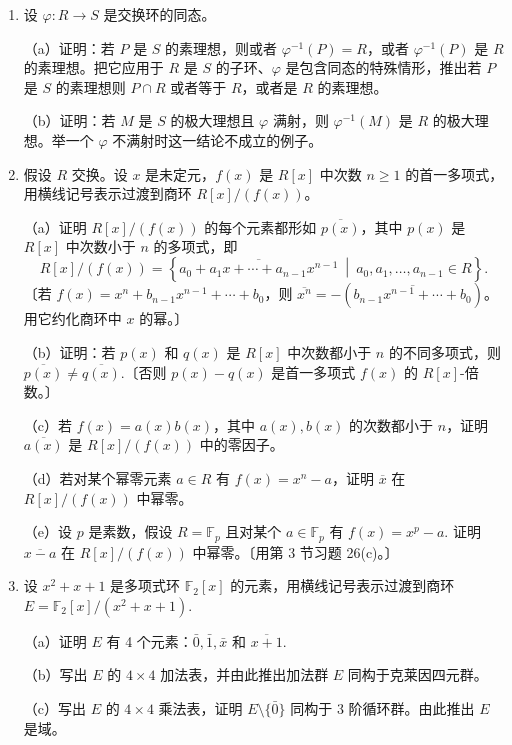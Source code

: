 \begin{enumerate}
\item 设 \(\varphi : R \to S\) 是交换环的同态。

（a）证明：若 \(P\) 是 \(S\) 的素理想，则或者 \(\varphi^{-1}(P) = R\)，或者 \(\varphi^{-1}(P)\) 是 \(R\) 的素理想。把它应用于 \(R\) 是 \(S\) 的子环、\(\varphi\) 是包含同态的特殊情形，推出若 \(P\) 是 \(S\) 的素理想则 \(P \cap R\) 或者等于 \(R\)，或者是 \(R\) 的素理想。

（b）证明：若 \(M\) 是 \(S\) 的极大理想且 \(\varphi\) 满射，则 \(\varphi^{-1}(M)\) 是 \(R\) 的极大理想。举一个 \(\varphi\) 不满射时这一结论不成立的例子。

\item 假设 \(R\) 交换。设 \(x\) 是未定元，\(f(x)\) 是 \(R[x]\) 中次数 \(n \geq 1\) 的首一多项式，用横线记号表示过渡到商环 \(R[x]/(f(x))\)。

（a）证明 \(R[x]/(f(x))\) 的每个元素都形如 \(\overline{p(x)}\)，其中 \(p(x)\) 是 \(R[x]\) 中次数小于 \(n\) 的多项式，即
\[
R[x]/(f(x)) = \left\{\overline{a_0 + a_1x + \cdots + a_{n-1}x^{n-1}} \ \middle|\ a_0, a_1, \ldots, a_{n-1} \in R\right\}.
\]
〔若 \(f(x) = x^n + b_{n-1}x^{n-1} + \cdots + b_0\)，则 \(\overline{x^n} = -(\overline{b_{n-1}x^{n-1} + \cdots + b_0})\)。用它约化商环中 \(x\) 的幂。〕

（b）证明：若 \(p(x)\) 和 \(q(x)\) 是 \(R[x]\) 中次数都小于 \(n\) 的不同多项式，则 \(\overline{p(x)} \neq \overline{q(x)}\).〔否则 \(p(x) - q(x)\) 是首一多项式 \(f(x)\) 的 \(R[x]\)-倍数。〕

（c）若 \(f(x) = a(x)b(x)\)，其中 \(a(x), b(x)\) 的次数都小于 \(n\)，证明 \(\overline{a(x)}\) 是 \(R[x]/(f(x))\) 中的零因子。

（d）若对某个幂零元素 \(a \in R\) 有 \(f(x) = x^n - a\)，证明 \(\overline{x}\) 在 \(R[x]/(f(x))\) 中幂零。

（e）设 \(p\) 是素数，假设 \(R = \mathbb{F}_p\) 且对某个 \(a \in \mathbb{F}_p\) 有 \(f(x) = x^p - a\). 证明 \(\overline{x-a}\) 在 \(R[x]/(f(x))\) 中幂零。〔用第 3 节习题 26(c)。〕

\item 设 \(x^2 + x + 1\) 是多项式环 \(\mathbb{F}_2[x]\) 的元素，用横线记号表示过渡到商环 \(E = \mathbb{F}_2[x]/(x^2+x+1)\).

（a）证明 \(E\) 有 4 个元素：\(\bar{0}, \bar{1}, \bar{x}\) 和 \(\overline{x+1}\).

（b）写出 \(E\) 的 \(4 \times 4\) 加法表，并由此推出加法群 \(E\) 同构于克莱因四元群。

（c）写出 \(E\) 的 \(4 \times 4\) 乘法表，证明 \(E \setminus \{\bar{0}\}\) 同构于 3 阶循环群。由此推出 \(E\) 是域。


\end{enumerate}
